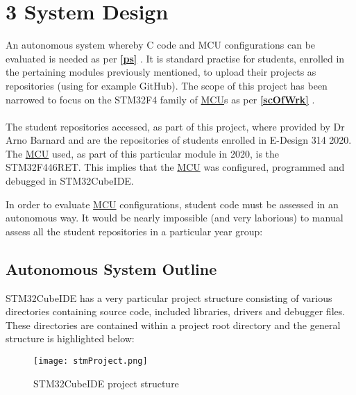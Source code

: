 

\chapter*{3 System Design}
\label{intro}
\setcounter{chapter}{3}
\setcounter{section}{0}
\setcounter{figure}{0}
\setcounter{table}{0}
An autonomous system whereby C code and MCU configurations can be evaluated is needed as per \textbf{\ref{ps} }. It is standard practise for students, enrolled in the pertaining modules previously mentioned, to upload their projects as repositories (using for example GitHub). The scope of this project has been narrowed to focus on the STM32F4 family of \hyperref[listAbr]{MCU}s as per \textbf{\ref{scOfWrk} }. 
\\\\
The student repositories accessed, as part of this project, where provided by Dr Arno Barnard and are the repositories of students enrolled in E-Design 314 2020. The \hyperref[listAbr]{MCU} used, as part of this particular module in 2020, is the STM32F446RET. This implies that the \hyperref[listAbr]{MCU} was configured, programmed and debugged in STM32CubeIDE.

In order to evaluate \hyperref[listAbr]{MCU} configurations, student code must be assessed in an autonomous way. It would be nearly impossible (and very laborious) to manual assess all the student repositories in a particular year group:

\section{Autonomous System Outline}
\label{aso}


STM32CubeIDE has a very particular project structure consisting of various directories containing source code, included libraries, drivers and debugger files. These directories are contained within a project root directory and the general structure is highlighted below:

\begin{figure}[H]
\begin{center}
\texttt{[image: stmProject.png]}
\caption{STM32CubeIDE project structure}
\label{stmProj}
\end{center}
\end{figure}

